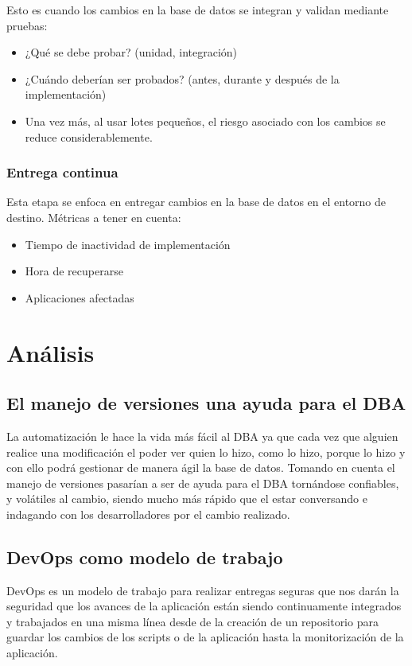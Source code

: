 \documentclass[preprint,12pt]{elsarticle}
\begin{document}
Esto es cuando los cambios en la base de datos se integran y validan mediante pruebas:
\begin{itemize}
\item ¿Qué se debe probar? (unidad, integración)
\item ¿Cuándo deberían ser probados? (antes, durante y después de la implementación)
\item Una vez más, al usar lotes pequeños, el riesgo asociado con los cambios se reduce considerablemente.
\end{itemize}


\subsubsection{\textbf{Entrega continua}}

Esta etapa se enfoca en entregar cambios en la base de datos en el entorno de destino. Métricas a tener en cuenta:
\begin{itemize}
\item Tiempo de inactividad de implementación
\item Hora de recuperarse
\item Aplicaciones afectadas \cite{CI/CD}
\end{itemize}
 



\section{Análisis}

\subsection{\textbf{El manejo de versiones una ayuda para el DBA}}
La automatización le hace la vida más fácil al DBA ya que cada vez que alguien realice una modificación el poder ver quien lo hizo, como lo hizo, porque lo hizo y con ello podrá gestionar de manera ágil la base de datos. Tomando en cuenta el manejo de versiones pasarían a ser de ayuda para el DBA tornándose confiables, y volátiles al cambio, siendo mucho más rápido que el estar conversando e indagando con los desarrolladores por el cambio realizado.
\subsection{\textbf{DevOps como modelo de trabajo}}
DevOps es un modelo de trabajo para realizar entregas seguras que nos darán la seguridad que los avances de la aplicación están siendo continuamente integrados y trabajados en una misma línea desde de la creación de un repositorio para guardar los cambios de los scripts o de la aplicación hasta la monitorización de la aplicación.
\end{document}

